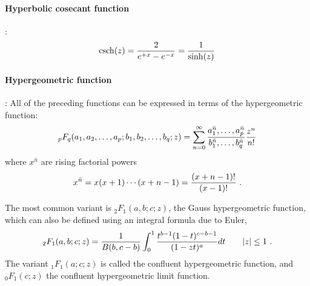 \paragraph*{Hyperbolic cosecant function}\hspace{-0.8em}:
\[
\operatorname{csch}(z) = \frac{2}{e^{+x} - e^{-x} } = \frac{1}{\sinh(z)} \notag 
\]


\paragraph*{Hypergeometric function}\hspace{-0.8em}\cite{Abramowitz1965,Graham1994}: All of the preceding functions can be expressed in terms of the hypergeometric function:
\[
{}_p F_q (a_1, a_2, \ldots, a_p ; b_1, b_2, \ldots, b_q; z) = \sum_{n=0}^{\infty} \frac{a_1^{\bar{n}},\ldots,a_p^{\bar{n}}} {b_1^{\bar{n}},\ldots,b_q^{\bar{n}}}  \frac{z^n}{n!} 
\notag
\]
where $x^{\bar{n}}$ are rising factorial powers~\cite{Abramowitz1965, Graham1994}
\[
x^{\bar{n}} = x (x+1) \cdots (x+n-1) = \frac{ (x+n-1)!} {(x-1)!}  \ .	
\]

The most common variant is ${}_2 F_1 (a,b;c;z)$, the Gauss hypergeometric function, which can also be defined using an integral formula due to Euler, 
\[
{}_2 F_1 (a,b;c;z) = \frac{1}{B(b,c-b)} \int_0^1 \frac{t^{b-1} (1-t)^{c-b-1} }{ (1- z t)^a } dt \qquad |z|\leq 1
\checked
\ .
\]
The variant ${}_1 F_1 (a;c;z)$ is called the confluent hypergeometric function,
and ${}_0 F_1 (c;z)$ the confluent hypergeometric limit function.



